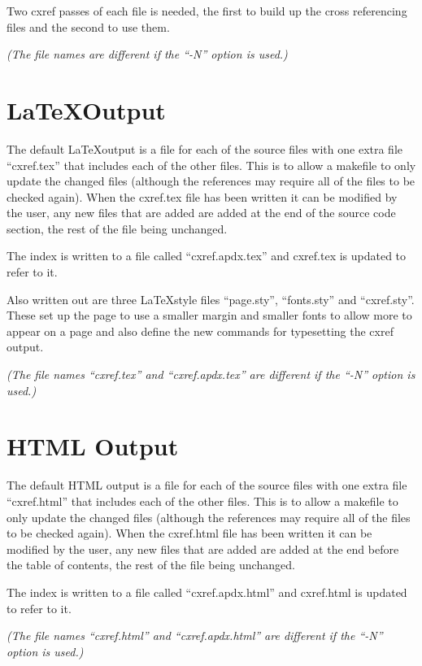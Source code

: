 Two cxref passes of each file is needed, the first to build up the cross
referencing files and the second to use them.

{\it (The file names are different if the ``-N'' option is used.)}

\section{\LaTeX Output}

The default \LaTeX output is a file for each of the source files with one extra
file ``cxref.tex'' that includes each of the other files.  This is to allow a
makefile to only update the changed files (although the references may require
all of the files to be checked again).  When the cxref.tex file has been written
it can be modified by the user, any new files that are added are added at the
end of the source code section, the rest of the file being unchanged.

The index is written to a file called ``cxref.apdx.tex'' and cxref.tex is updated
to refer to it.

Also written out are three \LaTeX style files ``page.sty'', ``fonts.sty'' and
``cxref.sty''.  These set up the page to use a smaller margin and smaller fonts to
allow more to appear on a page and also define the new commands for typesetting
the cxref output.

{\it (The file names ``cxref.tex'' and ``cxref.apdx.tex'' are different if the ``-N''
option is used.)}

\section{HTML Output}

The default HTML output is a file for each of the source files with one extra
file ``cxref.html'' that includes each of the other files.  This is to allow a
makefile to only update the changed files (although the references may require
all of the files to be checked again).  When the cxref.html file has been
written it can be modified by the user, any new files that are added are added
at the end before the table of contents, the rest of the file being unchanged.

The index is written to a file called ``cxref.apdx.html'' and cxref.html is
updated to refer to it.

{\it (The file names ``cxref.html'' and ``cxref.apdx.html'' are different if the ``-N''
option is used.)}

